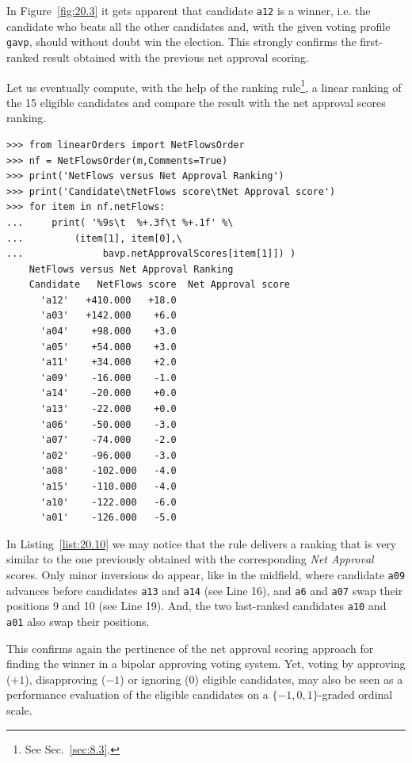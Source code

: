In Figure~\vref{fig:20.3} it gets apparent that candidate \texttt{a12} is a \Condorcet winner, i.e. the candidate who beats all the other candidates and, with the given voting profile \texttt{gavp}, should without doubt win the election. This strongly confirms the first-ranked result obtained with the previous net approval scoring. 

Let us eventually compute, with the help of the \NetFlows ranking rule\footnote{See Sec.~\ref{sec:8.3}.}, a linear ranking of the 15 eligible candidates and compare the result with the net approval scores ranking.
\begin{lstlisting}[caption={Comparing the net approval and the \NetFlows rankings},label=list:20.10]
>>> from linearOrders import NetFlowsOrder
>>> nf = NetFlowsOrder(m,Comments=True)
>>> print('NetFlows versus Net Approval Ranking')
>>> print('Candidate\tNetFlows score\tNet Approval score')
>>> for item in nf.netFlows:
...     print( '%9s\t  %+.3f\t %+.1f' %\
...	        (item[1], item[0],\
...              bavp.netApprovalScores[item[1]]) ) 
    NetFlows versus Net Approval Ranking
    Candidate	NetFlows score	Net Approval score
      'a12'	  +410.000	 +18.0
      'a03'	  +142.000	  +6.0
      'a04'	   +98.000	  +3.0
      'a05'	   +54.000	  +3.0
      'a11'	   +34.000	  +2.0
      'a09'	   -16.000	  -1.0
      'a14'	   -20.000	  +0.0
      'a13'	   -22.000	  +0.0
      'a06'	   -50.000	  -3.0
      'a07'	   -74.000	  -2.0
      'a02'	   -96.000	  -3.0
      'a08'	   -102.000	  -4.0
      'a15'	   -110.000	  -4.0
      'a10'	   -122.000	  -6.0
      'a01'	   -126.000	  -5.0
\end{lstlisting}
In Listing~\vref{list:20.10} we may notice that the \NetFlows rule delivers a ranking that is very similar to the one previously obtained with the corresponding \emph{Net Approval} scores. Only minor inversions do appear, like in the midfield, where candidate \texttt{a09} advances before candidates \texttt{a13} and \texttt{a14} (see Line 16), and \texttt{a6} and \texttt{a07} swap their positions 9 and 10 (see Line 19). And, the two last-ranked candidates \texttt{a10} and \texttt{a01} also swap their positions.

This confirms again the pertinence of the net approval scoring approach for finding the winner in a bipolar approving voting system. Yet, voting by approving ($+1$), disapproving ($-1$) or ignoring ($0$) eligible candidates, may also be seen as a performance evaluation of the eligible candidates on a $\{-1, 0, 1\}$-graded ordinal scale.

